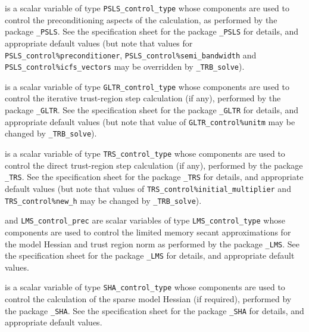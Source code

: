 \documentclass{galahad}
\newcommand{\packagename}{TRB}
\newcommand{\fullpackagename}{\libraryname\_\packagename}
\newcommand{\solver}{{\tt \fullpackagename\_solve}}
\begin{document}
\begin{description}
 is a scalar variable of type
{\tt PSLS\_control\_type}
whose components are used to control the preconditioning
aspects of the calculation, as performed by the package
{\tt \libraryname\_PSLS}.
See the specification sheet for the package
{\tt \libraryname\_PSLS}
for details, and appropriate default values (but note that values for
{\tt PSLS\_control\%preconditioner},
{\tt PSLS\_control\%semi\_bandwidth} and
{\tt PSLS\_control\%icfs\_vectors}
may be overridden by \solver).

 is a scalar variable of type
{\tt GLTR\_control\_type}
whose components are used to control the
iterative trust-region step calculation (if any),
performed by the package
{\tt \libraryname\_GLTR}.
See the specification sheet for the package
{\tt \libraryname\_GLTR}
for details, and appropriate default values
(but note that value of
{\tt GLTR\_control\%unitm}
may be changed by \solver).

 is a scalar variable of type
{\tt TRS\_control\_type}
whose components are used to control the
direct trust-region step calculation (if any),
performed by the package
{\tt \libraryname\_TRS}.
See the specification sheet for the package
{\tt \libraryname\_TRS}
for details, and appropriate default values
(but note that values of
{\tt TRS\_control\%initial\_multiplier}
and
{\tt TRS\_control\%new\_h}
may be changed by \solver).

 and {\tt LMS\_control\_prec}
are scalar variables of type
{\tt LMS\_control\_type}
whose components are used to control the limited memory secant
approximations for the model Hessian and trust region norm as
performed by the package
{\tt \libraryname\_LMS}.
See the specification sheet for the package
{\tt \libraryname\_LMS}
for details, and appropriate default values.

 is a scalar variable of type
{\tt SHA\_control\_type}
whose components are used to control the
calculation of the sparse model Hessian (if required),
performed by the package
{\tt \libraryname\_SHA}.
See the specification sheet for the package
{\tt \libraryname\_SHA}
for details, and appropriate default values.

\end{description}

\end{document}
